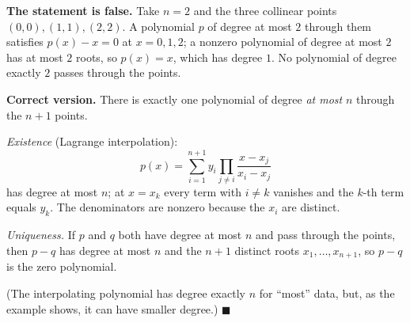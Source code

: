 \textbf{The statement is false.} Take $n=2$ and the three collinear points $(0,0),(1,1),(2,2)$. A polynomial $p$ of degree at most $2$ through them satisfies $p(x)-x=0$ at $x=0,1,2$; a nonzero polynomial of degree at most $2$ has at most $2$ roots, so $p(x)=x$, which has degree $1$. No polynomial of degree exactly $2$ passes through the points.

\textbf{Correct version.} There is exactly one polynomial of degree \emph{at most} $n$ through the $n+1$ points.

\emph{Existence} (Lagrange interpolation):
\[
p(x)=\sum_{i=1}^{n+1}y_i\prod_{j\ne i}\dfrac{x-x_j}{x_i-x_j}
\]
has degree at most $n$; at $x=x_k$ every term with $i\ne k$ vanishes and the $k$-th term equals $y_k$. The denominators are nonzero because the $x_i$ are distinct.

\emph{Uniqueness.} If $p$ and $q$ both have degree at most $n$ and pass through the points, then $p-q$ has degree at most $n$ and the $n+1$ distinct roots $x_1,\dots,x_{n+1}$, so $p-q$ is the zero polynomial.

(The interpolating polynomial has degree exactly $n$ for ``most'' data, but, as the example shows, it can have smaller degree.) $\blacksquare$
